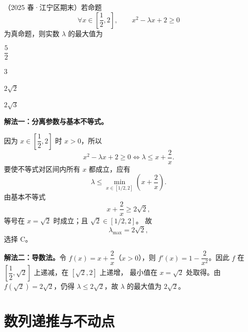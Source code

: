\documentclass[zihao=-4]{exam-zh}
\begin{document}
\begin{question}[points=5]
（2025 春·江宁区期末）若命题
\[
 \forall x\in\left[\frac12,2\right],\qquad
 x^2-\lambda x+2\ge0
\]
为真命题，则实数 $\lambda$ 的最大值为 \paren[C]
\begin{choices}
  \item $\dfrac52$
  \item $3$
  \item $2\sqrt2$
  \item $2\sqrt3$
\end{choices}
\begin{solution}
\textbf{解法一：分离参数与基本不等式。}

因为 $x\in\left[\dfrac12,2\right]$ 时 $x>0$，所以
\[
 x^2-\lambda x+2\ge0
 \iff \lambda\le x+\frac2x.
\]
要使不等式对区间内所有 $x$ 都成立，应有
\[
 \lambda\le
 \min_{x\in[1/2,2]}\left(x+\frac2x\right).
\]
由基本不等式
\[
 x+\frac2x\ge2\sqrt2,
\]
等号在 $x=\sqrt2$ 时成立；且 $\sqrt2\in[1/2,2]$。
故
\[
 \boxed{\lambda_{\max}=2\sqrt2},
\]
选择 C。\par\noindent
\textbf{解法二：导数法。}令 $f(x)=x+\dfrac2x$（$x>0$），则
$f'(x)=1-\dfrac2{x^2}$。因此 $f$ 在
$\left[\dfrac12,\sqrt2\right]$ 上递减，在 $[\sqrt2,2]$ 上递增，
最小值在 $x=\sqrt2$ 处取得。由 $f(\sqrt2)=2\sqrt2$，仍得
$\lambda\le2\sqrt2$，故 $\lambda$ 的最大值为 $2\sqrt2$。
\end{solution}
\end{question}

\clearpage
\section{数列递推与不动点}
\end{document}
